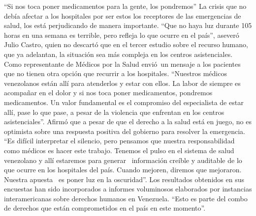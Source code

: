 \documentclass{article}%
\begin{document}
\newline%
%
“Si nos toca poner medicamentos para la gente, los pondremos”%
\newline%
%
La crisis que no debía afectar a los hospitales por ser estos los receptores de las emergencias de salud, los está perjudicando de manera importante. “Que no haya luz durante 105 horas en una semana es terrible, pero refleja lo que ocurre en el país”, aseveró Julio Castro, quien no descartó que en el tercer estudio sobre el recurso humano, que ya adelantan, la situación sea más compleja en los centros asistenciales.%
\newline%
%
Como representante de Médicos por la Salud envió~un mensaje a los pacientes que no tienen otra opción que recurrir a los hospitales. “Nuestros médicos venezolanos están allí para atenderlos y estar con ellos. La labor de siempre es acompañar en el dolor y si nos toca poner medicamentos, pondremos medicamentos. Un valor fundamental es el compromiso del especialista de estar allí, pase lo que pase, a pesar de la violencia que enfrentan en los centros asistenciales”.%
\newline%
%
Afirmó que a pesar de que el derecho a la salud está en juego, no es optimista sobre una respuesta positiva del gobierno para resolver la emergencia. “Es difícil interpretar el silencio, pero pensamos que nuestra responsabilidad como médicos es hacer este trabajo. Tenemos el pulso en el sistema de salud venezolano y allí estaremos para generar~ información creíble y auditable de lo que ocurre en los hospitales del país. Cuando mejoren, diremos que mejoraron. Nuestra apuesta~ es poner luz en la oscuridad”.%
\newline%
%
Los resultados obtenidos en sus encuestas han sido incorporados a informes voluminosos elaborados por instancias interamericanas sobre derechos humanos en Venezuela. “Esto es parte del combo de derechos que están comprometidos en el país en este momento”.%
\newline%
%
\end{document}
